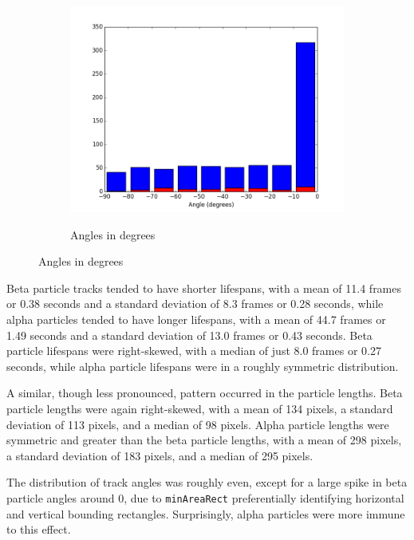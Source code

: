 \documentclass[notitlepage]{article}
\begin{document}
\begin{figure}[h!]
\begin{subfigure}{.3\textwidth}
  \includegraphics[width=\textwidth]{angle}
  \label{fig:angle}
  \caption{Angles in degrees}
\end{subfigure}
\label{fig:test}
\end{figure}

Beta particle tracks tended to have shorter lifespans, with a mean of 11.4 frames or 0.38 seconds and a standard deviation of 8.3 frames or 0.28 seconds, while alpha particles tended to have longer lifespans, with a mean of 44.7 frames or 1.49 seconds and a standard deviation of 13.0 frames or 0.43 seconds.  Beta particle lifespans were right-skewed, with a median of just 8.0 frames or 0.27 seconds, while alpha particle lifespans were in a roughly symmetric distribution. 

A similar, though less pronounced, pattern occurred in the particle lengths.  Beta particle lengths were again right-skewed, with a mean of 134 pixels, a standard deviation of 113 pixels, and a median of 98 pixels.  Alpha particle lengths were symmetric and greater than the beta particle lengths, with a mean of 298 pixels, a standard deviation of 183 pixels, and a median of 295 pixels.

The distribution of track angles was roughly even, except for a large spike in beta particle angles around 0, due to \texttt{minAreaRect} preferentially identifying horizontal and vertical bounding rectangles.  Surprisingly, alpha particles were more immune to this effect. 
\end{document}
